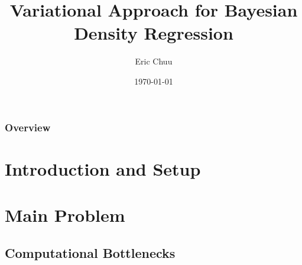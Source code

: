 \documentclass{beamer}
\title[]{Variational Approach for Bayesian Density Regression} %
\author{Eric Chuu} %
\institute[TAMU] %
{
Texas A\&M University \\ %
\medskip
\textit{ericchuu@tamu.com} %
}
\date{\today} %
\begin{document}
\begin{frame}
\titlepage %
\end{frame}

\begin{frame}
\frametitle{Overview} %
\tableofcontents %
\end{frame}


\section{Introduction and Setup} %

\section{Main Problem} 

\subsection{Computational Bottlenecks}




\end{document}
